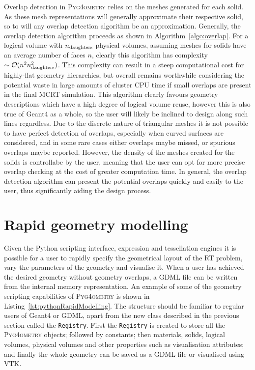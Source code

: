 \documentclass[final,5p,times,twocolumn]{elsarticle}
\newcommand{\PYGEOMETRY}{\textsc{Pyg4ometry}}
\begin{document}
Overlap detection in \PYGEOMETRY{} relies on the meshes generated for each solid.  As
these mesh representations will generally approximate their respective solid,
so to will any overlap detection algorithm be an approximation. Generally, the overlap detection
algorithm proceeds as shown in Algorithm~\ref{algo:overlap}.
For a logical volume with $n_{\rm daughters}$ physical volumes, assuming meshes for solids have an average number of faces $n$, clearly this algorithm
has complexity $\sim \mathcal{O}(n^2 n_{\rm daughters}^2)$. This complexity
can result in a steep computational cost for highly-flat geometry
hierarchies, but overall remains worthwhile considering the potential
waste in large amounts of cluster CPU time if small overlaps are present in the final MCRT simulation. This algorithm clearly favours geometry
descriptions which have a high degree of logical volume reuse, however this is also true of Geant4 as a whole, so the user will likely be inclined to design along such lines regardless.
Due to the discrete nature of triangular meshes it is not possible to have perfect detection
of overlaps, especially when curved surfaces are considered, and in some rare
cases either overlaps maybe missed, or spurious overlaps maybe reported.  However, the density of the meshes
created for the solids is controllabe by the user, meaning that the user
can opt for more precise overlap checking at the cost of greater
computation time.  In general, the overlap detection algorithm can
present the potential overlaps quickly and easily to the user, thus
significantly aiding the design process.

\section{Rapid geometry modelling}
Given the Python scripting interface, expression  and tessellation engines it is possible for a user to rapidly specify the geometrical layout of the RT problem, vary
the parameters of the geometry and visualise it.  When a user has achieved the desired geometry without geometry overlaps, a GDML file can be written
from the internal memory representation. An example of some of the geometry scripting capabilities of \PYGEOMETRY{} is shown in Listing~\ref{lst:pythonRapidModelling}. The structure should be familiar to regular
users of Geant4 or GDML, apart from the new class described in the previous section called the \verb|Registry|. First the \verb|Registry| is created to store all
the \PYGEOMETRY{} objects; followed by constants;  then materials, solids, logical volumes, physical volumes and other properties such as visualisation attributes; and finally the whole geometry can be saved
as a GDML file or visualised using VTK.
\end{document}
